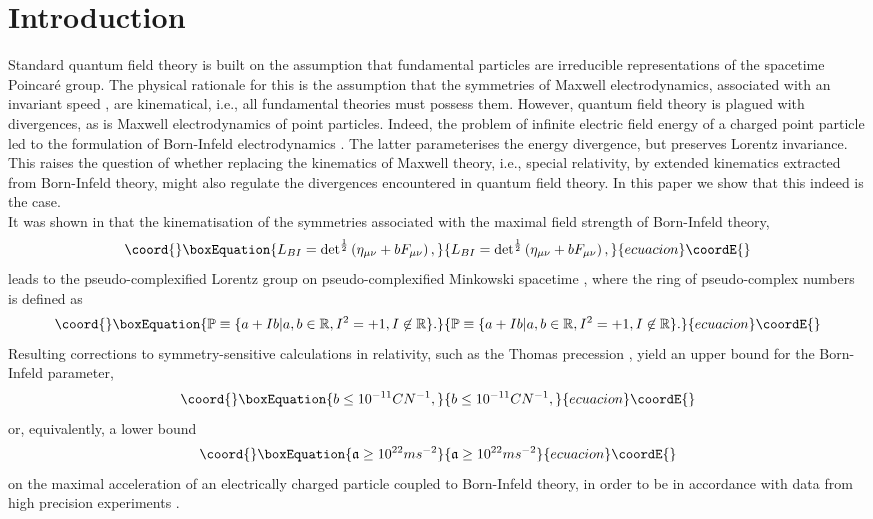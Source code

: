 \documentclass[a4paper,aps,prd,showkeys,showpacs,superscriptaddress,preprint]{revtex4}
\providecommand{\pc}{\mathbb{P}}
\providecommand{\reals}{\mathbb{R}}
\begin{document}
%


\section{Introduction}
Standard quantum field theory is built on the assumption that
fundamental particles are irreducible representations of the spacetime
Poincar\'e group. The physical rationale for this is the
assumption that the symmetries of Maxwell electrodynamics, associated
with an invariant speed \coordHE{}, are
kinematical, i.e., all fundamental theories must possess them.
However, quantum field theory is plagued with divergences, as is
Maxwell electrodynamics of point particles. Indeed, the problem of
infinite electric field energy of a charged point particle led to
the formulation of Born-Infeld electrodynamics \cite{Born:1934gh}. The latter parameterises
the energy divergence, but preserves Lorentz invariance. This
raises the question of whether replacing the kinematics of Maxwell
theory, i.e., special relativity, by extended kinematics extracted from
Born-Infeld theory, might also regulate the divergences encountered
in quantum field theory. In this paper we show that this indeed is
the case.\\

It was shown in \cite{Schuller:2002rr,Schuller:2002fn} that the kinematisation of the
symmetries associated with the maximal field strength \coordHE{}
 of Born-Infeld theory,
\begin{equation}\coord{}\boxEquation{\label{BIoriginal}
  L_{BI} = {\det}^\frac{1}{2}\left(\eta_{\mu\nu} + b
  F_{\mu\nu}\right),
}{L_{BI} = {\det}^\frac{1}{2}\left(\eta_{\mu\nu} + b
  F_{\mu\nu}\right),
}{ecuacion}\coordE{}\end{equation}
leads to the pseudo-complexified Lorentz group \myHighlight{$SO_\pc(1,3)$}\coordHE{} on
pseudo-complexified Minkowski spacetime \myHighlight{$\pc^{1,3}$}\coordHE{}, where the ring of
pseudo-complex numbers is defined as
\begin{equation}\coord{}\boxEquation{
  \pc \equiv \{a+Ib | a,b \in \reals, I^2=+1, I\not\in \reals\}.
}{
  \pc \equiv \{a+Ib | a,b \in \reals, I^2=+1, I\not\in \reals\}.
}{ecuacion}\coordE{}\end{equation}
Resulting corrections to symmetry-sensitive calculations in
relativity, such as the Thomas
precession \cite{Thomas}, yield an upper bound
\cite{Schuller:2002rr} for the Born-Infeld parameter,
\begin{equation}\coord{}\boxEquation{
  b \leq 10^{-11} C N^{-1},
}{
  b \leq 10^{-11} C N^{-1},
}{ecuacion}\coordE{}\end{equation}
or, equivalently, a lower bound
\begin{equation}\coord{}\boxEquation{\label{maxaccel}
  \mathfrak{a} \geq 10^{22} m s^{-2}
}{\mathfrak{a} \geq 10^{22} m s^{-2}
}{ecuacion}\coordE{}\end{equation}
on the maximal acceleration
of an electrically charged particle coupled to Born-Infeld theory, in
order to be in accordance with data from high precision
experiments \cite{Newman}. 
\end{document}
